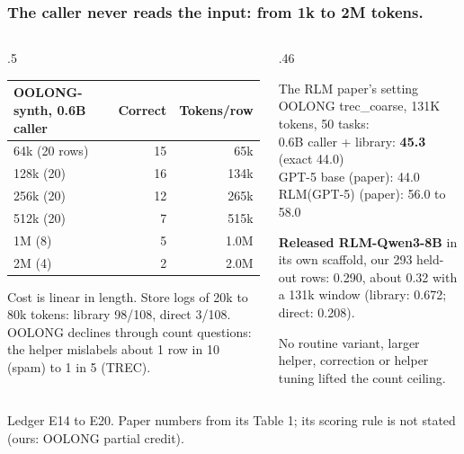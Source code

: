\documentclass[aspectratio=169,11pt]{beamer}
\newcommand{\source}[1]{\vfill{\scriptsize\color{Gray}#1\par}}
\begin{document}
\begin{frame}[t]
\frametitle{The caller never reads the input: from 1k to 2M tokens.}
\begin{columns}[T,onlytextwidth]
\begin{column}{.5\textwidth}
\footnotesize
\begin{tabular}{@{}lrr@{}}
\toprule
OOLONG-synth, 0.6B caller & Correct & Tokens/row \\
\midrule
64k (20 rows) & 15 & 65k \\
128k (20) & 16 & 134k \\
256k (20) & 12 & 265k \\
512k (20) & 7 & 515k \\
1M (8) & 5 & 1.0M \\
2M (4) & 2 & 2.0M \\
\bottomrule
\end{tabular}
\medskip

\small Cost is linear in length. Store logs of 20k to 80k tokens: library 98/108, direct 3/108. OOLONG declines through count questions: the helper mislabels about 1 row in 10 (spam) to 1 in 5 (TREC).
\end{column}
\begin{column}{.46\textwidth}
\begin{block}{The RLM paper's setting}
OOLONG trec\_coarse, 131K tokens, 50 tasks:\\[1mm]
0.6B caller + library: \textbf{45.3} (exact 44.0)\\
GPT-5 base (paper): 44.0\\
RLM(GPT-5) (paper): 56.0 to 58.0
\end{block}
\small \textbf{Released RLM-Qwen3-8B} in its own scaffold, our 293 held-out rows: 0.290, about 0.32 with a 131k window (library: 0.672; direct: 0.208).\par\smallskip
\small No routine variant, larger helper, correction or helper tuning lifted the count ceiling.
\end{column}
\end{columns}
\source{Ledger E14 to E20. Paper numbers from its Table 1; its scoring rule is not stated (ours: OOLONG partial credit).}
\end{frame}
\end{document}
